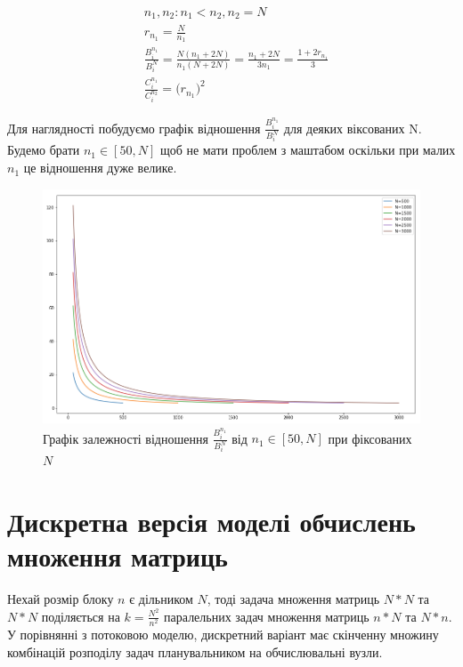 \begin{equation}
\label{eq:diff_n1n2}
	\begin{aligned}
	& n_1, n_2 : n_1 < n_2, n_2 = N
	\\
	& r_{n_1} = \frac{N}{n_{1}}
	\\
	& \frac{B_i^{n_1}}{B_i^{N}} =\frac{ N ( n_1 + 2N ) }{n_1 ( N + 2N )} = \frac{n_1 + 2N}{3n_1} = \frac{1 + 2r_{n_1}}{3}
	\\
	& \frac{C_i^{n_1}}{C_i^{n_2}} = \bigg( r_{n_1} \bigg)^2
	\end{aligned}
\end{equation}

Для наглядності побудуємо графік відношення $\frac{B_i^{n_1}}{B_i^{N}}$ для деяких віксованих N. Будемо брати $n_1 \in [50, N]$ щоб не мати проблем з маштабом оскільки при малих $n_1$ це відношення дуже велике.

\begin{figure}[H]
	\centering
	\includegraphics[width=\textwidth]{theory/img/B_times_diff_N}
	\caption{Графік залежності відношення $\frac{B_i^{n_1}}{B_i^{N}}$ від $n_1 \in [50, N]$ при фіксованих $N$ }
	\label{fig:one_diff_N}
\end{figure}


\section{Дискретна версія моделі обчислень множення матриць}
Нехай розмір блоку $n$ є дільником $N$, тоді задача множення матриць $N*N$ та $N*N$ поділяється на $k = \frac{N^2}{n^2}$ паралельних задач множення матриць $n*N$ та $N*n$.
У порівнянні з потоковою моделю, дискретний варіант має скінченну множину комбінацій розподілу задач планувальником на обчислювальні вузли.

